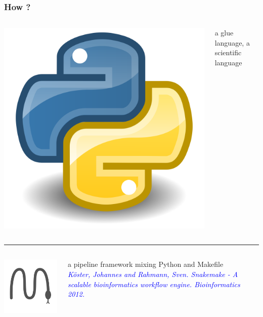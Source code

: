 \documentclass{beamer}
\begin{document}
\begin{frame}
\frametitle{How ?}

\begin{columns}
\begin{column}{1.5cm}
\includegraphics[height=0.2\textheight]{images/logo_python.png} 
\end{column}
\begin{column}{9cm}
a glue language, a scientific language
\end{column}
\end{columns}

\rule{\textwidth}{1pt}


\begin{columns}
\begin{column}{1.5cm}
\includegraphics[height=0.2\textheight]{images/logo_snakemake.png}
\end{column}
\begin{column}{9cm}
a pipeline 
framework mixing Python and Makefile \\
{\footnotesize \textcolor{blue}{\textit{Köster, Johannes and Rahmann, Sven. 
Snakemake - A scalable 
bioinformatics workflow engine. Bioinformatics 2012.}}}
\end{column}
\end{columns}


\end{frame}
\end{document}
